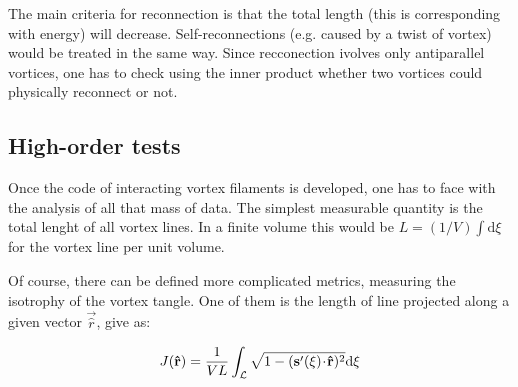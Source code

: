 The main criteria for reconnection is that the total length (this is corresponding with energy) will decrease. Self-reconnections (e.g. caused by a twist of vortex) would be treated in the same way. Since recconection ivolves only antiparallel vortices, one has to check using the inner product whether two vortices could physically reconnect or not.

\subsection*{High-order tests}

Once the code of interacting vortex filaments is developed, one has to face with the analysis of all that mass of data. The simplest measurable quantity is the total lenght of all vortex lines. In a finite volume this would be $L = (1/V) \int \text{d}\xi$ for the vortex line per unit volume.

Of course, there can be defined more complicated metrics, measuring the isotrophy of the vortex tangle. One of them is the length of line projected along a given vector $\vec{\hat{r}}$, give as:

\begin{equation}
J(\mathbf{\hat{r}}) = \frac{1}{VL} \int_{\mathcal{L}} \sqrt{1 - (\mathbf{s}^{\prime}(\xi) \!\cdot\! \mathbf{\hat{r}})^2} \text{d}\xi
\end{equation}




\newpage
